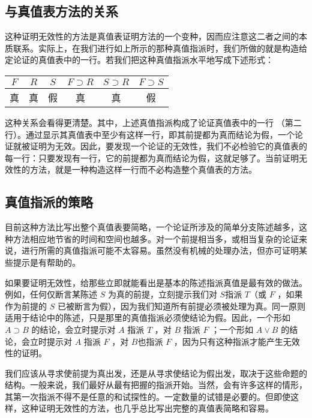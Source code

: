 \subsection{与真值表方法的关系}

这种证明无效性的方法是真值表证明方法的一个变种，因而应注意这二者之间的本质联系。实际上，在我们进行如上所示的那种真值指派时，我们所做的就是构造给定论证的真值表中的一行。若我们把这种真值指派水平地写成下述形式：

\begin{center}
\begin{tabular}{|cccccc|}
\hline
$F$ & $R$ & $S$ & $F \supset R$ & $S \supset R$ & $F \supset S$ \\
\hline
真 & 真 & 假 & 真 & 真 & 假 \\
\hline
\end{tabular}
\end{center}

这种关系会看得更清楚。其中，上述真值指派构成了论证真值表中的一行 （第二行）。通过显示其真值表中至少有这样一行，即其前提都为真而结论为假，一个论证就被证明为无效。因此，要发现一个论证的无效性，我们不必检验它的真值表的每一行：只要发现有一行，它的前提都为真而结论为假，这就足够了。当前证明无效性的方法，就是一种构造这样一行而不必构造整个真值表的方法。\cite{jeffrey1967}

\subsection{真值指派的策略}

目前这种方法比写出整个真值表要简略，一个论证所涉及的简单分支陈述越多，这种方法相应地节省的时间和空间也越多。对一个前提相当多，或相当复杂的论证来说，进行所需的真值指派可能不太容易。虽然没有机械的处理办法，但亦可证明某些提示是有帮助的。

如果要证明无效性，给那些立即就能看出是基本的陈述指派真值是最有效的做法。例如，任何仅断言某陈述 $S$ 为真的前提，立刻提示我们对 $S$指派 $T$（或 $F$ ，如果作为前提的 $S$ 已被断言为假），因为我们知道所有前提必须被处理为真。同一原则适用于结论中的陈述，只是那里的真值指派必须使结论为假。因此，一个形如 $A \supset B$ 的结论，会立时提示对 $A$ 指派 $T$ ，对 $B$ 指派 $F$ ；一个形如 $A \vee B$ 的结论，会立时提示对 $A$ 指派 $F$ ，对 $B$也指派 $F$ ，因为只有这种指派才能产生无效性的证明。

我们应该从寻求使前提为真出发，还是从寻求使结论为假出发，取决于这些命题的结构。一般来说，我们最好从最有把握的指派开始。当然，会有许多这样的情形，其第一次指派不得不是任意的和试探性的。一定数量的试错是必要的。但即使这样，这种证明无效性的方法，也几乎总比写出完整的真值表简略和容易。

